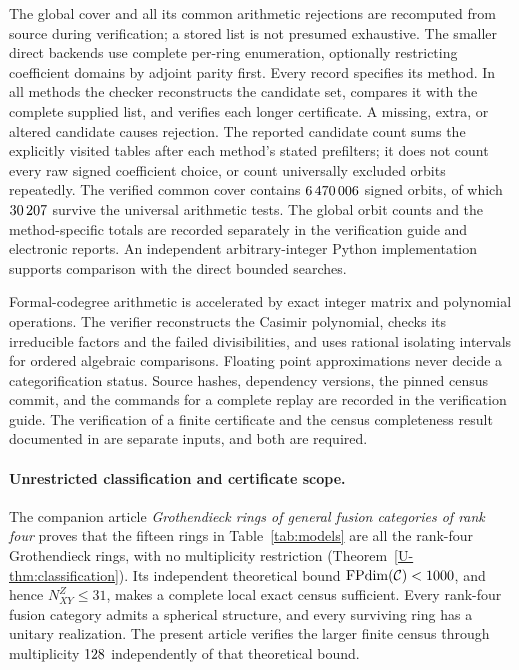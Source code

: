 The global cover and all its common arithmetic rejections are recomputed
from source during verification; a stored list is not presumed exhaustive.
The smaller direct backends use complete per-ring enumeration, optionally
restricting coefficient domains by adjoint parity first. Every record
specifies its method. In all methods the checker reconstructs the candidate
set, compares it with the complete supplied list, and verifies each longer
certificate. A missing, extra, or altered candidate causes rejection.
The reported candidate count sums the explicitly visited tables after
each method's stated prefilters; it does not count every raw signed
coefficient choice, or count universally excluded orbits repeatedly.
The verified common cover contains $6\,470\,006$ signed orbits,
of which $30\,207$ survive the universal arithmetic tests.
The global orbit counts and the method-specific totals are recorded
separately in the verification guide and electronic reports. An independent
arbitrary-integer Python implementation supports comparison with the
direct bounded searches.

Formal-codegree arithmetic is accelerated by exact integer matrix and
polynomial operations. The verifier reconstructs the Casimir polynomial,
checks its irreducible factors and the failed divisibilities, and uses
rational isolating intervals for ordered algebraic comparisons. Floating
point approximations never decide a categorification status. Source
hashes, dependency versions, the pinned census commit, and the commands
for a complete replay are recorded in the verification guide. The
verification of a finite certificate and the census completeness result
documented in \cite{Census} are separate inputs, and both are required.

\paragraph{Unrestricted classification and certificate scope.}
The companion article \emph{Grothendieck rings of general fusion categories
of rank four} proves that the fifteen rings in Table~\ref{tab:models}
are all the rank-four Grothendieck rings, with no multiplicity restriction
(Theorem~\ref{U-thm:classification}). Its independent theoretical bound
$\operatorname{FPdim}(\mathcal C)<1000$, and hence $N_{XY}^{Z}\le31$, makes a complete local
exact census sufficient. Every rank-four fusion category admits a
spherical structure, and every surviving ring has a unitary realization.
The present article verifies the larger finite census through
multiplicity $128$ independently of that theoretical bound.

